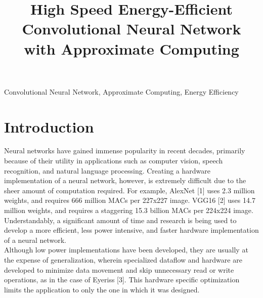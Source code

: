 \documentclass[conference]{IEEEtran}
\begin{document}
\title{High Speed Energy-Efficient Convolutional Neural Network with Approximate Computing}

\author{
\and
{}
}

\maketitle

\begin{abstract}
\blindtext[1]
\end{abstract}

\begin{IEEEkeywords}
Convolutional Neural Network, Approximate Computing, Energy Efficiency
\end{IEEEkeywords}

\IEEEpeerreviewmaketitle

\section{Introduction}
	Neural networks have gained immense popularity in recent decades, primarily because of their utility in applications such as computer vision, speech recognition, and natural language processing. Creating a hardware implementation of a neural network, however, is extremely difficult due to the sheer amount of computation required. For example, AlexNet [1] uses 2.3 million weights, and requires 666 million MACs per 227x227 image. VGG16 [2] uses 14.7 million weights, and requires a staggering 15.3 billion MACs per 224x224 image. Understandably, a significant amount of time and research is being used to develop a more efficient, less power intensive, and faster hardware implementation of a neural network.\\
	\indent Although low power implementations have been developed, they are usually at the expense of generalization, wherein specialized dataflow and hardware are developed to minimize data movement and skip unnecessary read or write operations, as in the case of Eyeriss [3]. This hardware specific optimization limits the application to only the one in which it was designed.
\end{document}
